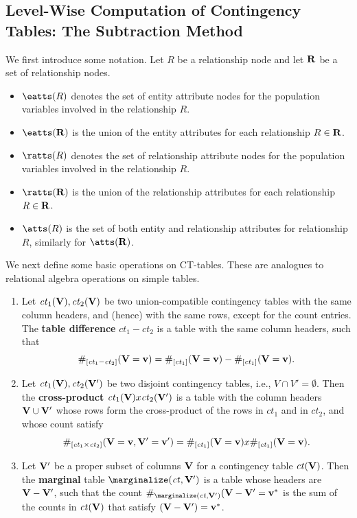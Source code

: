 \documentclass{article}
\newcommand{\ct}{\mathit{ct}}
\begin{document}
\subsection{Level-Wise Computation of Contingency Tables: The Subtraction Method} 

We first introduce some notation. Let $R$ be a relationship node and let $\mathbf{R}$ be a set of relationship nodes.

\begin{itemize}
\item $\eatts(R)$ denotes the set of entity attribute nodes for the population variables involved in the relationship $R$. 
\item $\eatts(\set{R})$ is the union of the entity attributes for each relationship $R \in \mathbf{R}$.
\item $\ratts(R)$ denotes the set of relationship attribute nodes for the population variables involved in the relationship $R$.
\item $\ratts(\set{R})$ is the union of the relationship attributes for each relationship $R \in \mathbf{R}$.
\item $\atts(R)$ is the set of both entity and relationship attributes for relationship $R$, similarly for $\atts({\set{R}})$.
\end{itemize}

We next define some basic operations on CT-tables. These are analogues to relational algebra operations on simple tables.

\begin{enumerate}
\item Let $\ct_{1}(\set{V}),\ct_{2}(\set{V})$ be two union-compatible contingency tables with the same column headers, and (hence) with the same rows, except for the count entries. The \textbf{table difference} $\ct_{1} - \ct_{2}$ is a table with the same column headers, such that $$\#_{[\ct_{1} - \ct_{2}]}(\set{V}=\set{v})= \#_{[\ct_{1}]}(\set{V}=\set{v}) - \#_{[\ct_{1}]}(\set{V}=\set{v}).$$
\item Let $\ct_{1}(\set{V}),\ct_{2}(\set{V'})$ be two disjoint contingency tables, i.e., $V \cap V' = \emptyset$. Then the \textbf{cross-product} $\ct_{1}(\set{V}) x \ct_{2}(\set{V'})$ is a table with the column headers $\mathbf{V} \cup \mathbf{V'}$ whose rows form the cross-product of the rows in $\ct_{1}$ and in $\ct_{2}$, and whose count satisfy $$\#_{[\ct_{1} \times  \ct_{2}]}(\set{V}=\set{v},\set{V'}=\set{v'})= \#_{[\ct_{1}]}(\set{V}=\set{v}) x \#_{[\ct_{1}]}(\set{V}=\set{v}).$$
\item Let $\mathbf{V'}$ be a proper subset of columns $\mathbf{V}$ for a contingency table $\ct(\set{V})$. Then the \textbf{marginal} table $\marginalize(\ct,\set{V'})$ is a table whose headers are $\mathbf{V}-\mathbf{V'}$, such that the count $\#_{\marginalize(\ct,\set{V'})}(\set{V}-\set{V'}=\set{v^{*}}$ is the sum of the counts in $\ct(\set{V})$ that satisfy $(\mathbf{V}-\mathbf{V'})=\mathbf{v^{*}}$.
\end{enumerate}
\end{document}
